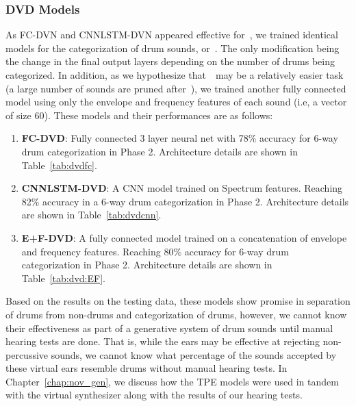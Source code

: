 \documentclass[\main/thesis.tex]{subfiles}
\begin{document}
\subsubsection{DVD Models}
\label{sec:dvd_arch}
As FC-DVN and CNNLSTM-DVN appeared effective for~\decfirst, we trained identical models for the categorization of drum sounds, or~\decsecond. The only modification being the change in the final output layers depending on the number of drums being categorized. In addition, as we hypothesize that~\decsecond~may be a relatively easier task (a large number of sounds are pruned after~\decfirst), we trained another fully connected model using only the envelope and frequency features of each sound (i.e, a vector of size 60). These models and their performances are as follows:

\begin{enumerate}
\item \textbf{FC-DVD}: Fully connected 3 layer neural net with 78\% accuracy for 6-way drum categorization in Phase 2. Architecture details are shown in Table~\ref{tab:dvdfc}.
\item \textbf{CNNLSTM-DVD}: A CNN model trained on Spectrum features. Reaching 82\% accuracy in a 6-way drum categorization in Phase 2. Architecture details are shown in Table~\ref{tab:dvdcnn}.
\item \textbf{E+F-DVD}: A fully connected model trained on a concatenation of envelope and frequency features. Reaching 80\% accuracy for 6-way drum categorization in Phase 2. Architecture details are shown in Table~\ref{tab:dvd:EF}.
\end{enumerate}
Based on the results on the testing data, these models show promise in separation of drums from non-drums and categorization of drums, however, we cannot know their effectiveness as part of a generative system of drum sounds until manual hearing tests are done. That is, while the ears may be effective at rejecting non-percussive sounds, we cannot know what percentage of the sounds accepted by these virtual ears resemble drums without manual hearing tests. In Chapter~\ref{chap:nov_gen}, we discuss how the TPE models were used in tandem with the virtual synthesizer along with the results of our hearing tests.
\end{document}
